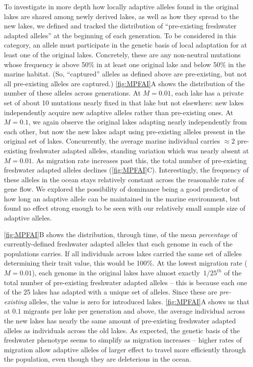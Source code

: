 \documentclass{article}
\begin{document}
To investigate in more depth how locally adaptive alleles found in the original lakes are shared among newly derived lakes, as well as how they spread to the new lakes, we defined and tracked the distribution of ``pre-existing freshwater adapted alleles'' at the beginning of each generation. 
To be considered in this category, an allele must participate in the genetic basis of local adaptation for at least one of the original lakes. 
Concretely, these are any non-neutral mutations whose frequency is above 50\% in at least one original lake and below 50\% in the marine habitat. 
(So, ``captured'' alleles as defined above are pre-existing, but not all pre-existing alleles are captured.)
\autoref{fig:MPFAI}A shows the distribution of the number of these alleles across generations. At $M = 0.01$, each lake has a private set of about 10 mutations nearly fixed in that lake but not elsewhere: new lakes independently acquire new adaptive alleles rather than pre-existing ones. 
At $M = 0.1$, we again observe the original lakes adapting nearly independently from each other, but now the new lakes adapt using pre-existing alleles present in the original set of lakes. 
Concurrently, the average marine individual carries $\approx 2$ pre-existing freshwater adapted alleles, standing variation which was nearly absent at $M=0.01$. As migration rate increases past this, the total number of pre-existing freshwater adapted alleles declines (\autoref{fig:MPFAI}C). Interestingly, the frequency of these alleles in the ocean
stays relatively constant across the reasonable rates of gene flow.
We explored the possibility of dominance being a good predictor of
how long an adaptive allele can be maintained in the marine environment,
but found no effect strong enough to be seen with our relatively small sample size of adaptive alleles.

\autoref{fig:MPFAI}B shows the distribution, through time, of the mean \emph{percentage} of currently-defined freshwater adapted alleles that each genome in each of the populations carries. 
If all individuals across lakes carried the same set of alleles determining their trait value, this would be 100\%. At the lowest migration rate ($M = 0.01$), each genome in the original lakes have almost exactly~$1/25^{th}$ of the total number of pre-existing freshwater adapted alleles -- this is because each one of the 25 lakes has adapted with a unique set of alleles. 
Since these are \emph{pre-existing} alleles, the value is zero for introduced lakes. 
\autoref{fig:MPFAI}A shows us that at $0.1$ migrants per lake per generation and above, the average individual across the new lakes has nearly the same amount of pre-existing freshwater adapted alleles as individuals across the old lakes. 
As expected, the genetic basis of the freshwater phenotype seems to simplify as migration increases -- higher rates of migration allow adaptive alleles of larger effect to travel more efficiently through the population, even though they are deleterious in the ocean. 
\end{document}

